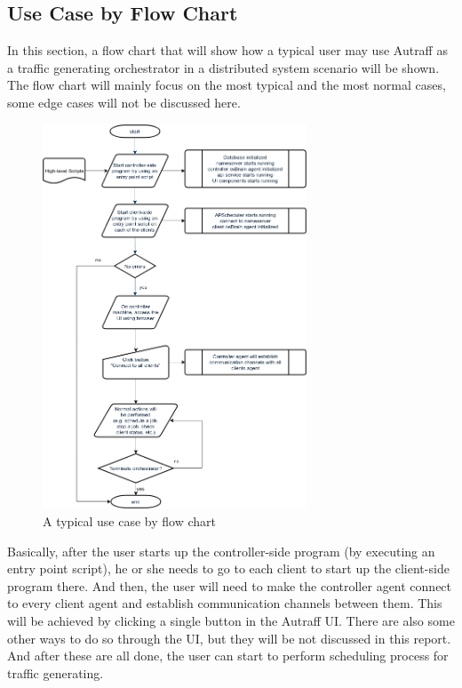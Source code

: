\documentclass[12pt]{report}
\begin{document}
\subsection{Use Case by Flow Chart}
In this section, a flow chart that will show how a typical user may use Autraff as a traffic generating orchestrator in a distributed system scenario will be shown. The flow chart will mainly focus on the most typical and the most normal cases, some edge cases will not be discussed here.\\

\begin{figure}[h!]
  \centering
  \includegraphics[width=0.7\textwidth]{./pictures/use-case}
  \caption{A typical use case by flow chart}
\end{figure}

Basically, after the user starts up the controller-side program (by executing an entry point script), he or she needs to go to each client to start up the client-side program there. And then, the user will need to make the controller agent connect to every client agent and establish communication channels between them. This will be achieved by clicking a single button in the Autraff UI. There are also some other ways to do so through the UI, but they will be not discussed in this report. And after these are all done, the user can start to perform scheduling process for traffic generating.
\end{document}
